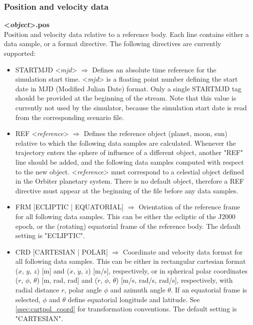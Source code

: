 \documentclass[Orbiter Technical Reference.tex]{subfiles}
\begin{document}
\subsubsection{Position and velocity data}
\textbf{<\textit{object}>.pos}\\
Position and velocity data relative to a reference body. Each line contains either a data sample, or a format directive. The following directives are currently supported:

\begin{itemize}
\item STARTMJD <\textit{mjd}> $\Rightarrow$ Defines an absolute time reference for the simulation start time. <\textit{mjd}> is a floating point number defining the start date in MJD (Modified Julian Date) format. Only a single STARTMJD tag should be provided at the beginning of the stream. Note that this value is currently not used by the simulator, because the simulation start date is read from the corresponding scenario file.
\item REF <\textit{reference}> $\Rightarrow$ Defines the reference object (planet, moon, sun) relative to which the following data samples are calculated. Whenever the trajectory enters the sphere of influence of a different object, another "REF" line should be added, and the following data samples computed with respect to the new object. <\textit{reference}> must correspond to a celestial object defined in the Orbiter planetary system. There is no default object, therefore a REF directive must appear at the beginning of the file before any data samples.
\item FRM [ECLIPTIC | EQUATORIAL] $\Rightarrow$ Orientation of the reference frame for all following data samples. This can be either the ecliptic of the J2000 epoch, or the (rotating) equatorial frame of the reference body. The default setting is "ECLIPTIC".
\item CRD [CARTESIAN | POLAR] $\Rightarrow$ Coordinate and velocity data format for all following data samples. This can be either in rectangular cartesian format ($x$, $y$, $z$) [m] and ($\dot{x}$, $\dot{y}$, $\dot{z}$) [m/s], respectively, or in spherical polar coordinates ($r$, $\phi$, $\theta$) [m, rad, rad] and ($\dot{r}$, $\dot{\phi}$, $\dot{\theta}$) [m/s, rad/s, rad/s], respectively, with radial distance $r$, polar angle $\phi$ and azimuth angle $\theta$. If an equatorial frame is selected, $\phi$ and $\theta$ define equatorial longitude and latitude. See \ref{ssec:cartpol_coord} for transformation conventions. The default setting is "CARTESIAN".
\end{itemize}
\end{document}
